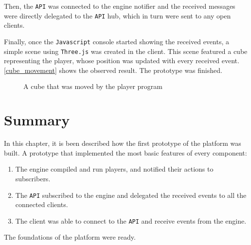 \documentclass[a4paper,11pt,titlepage,abstract,numbers=noenddot,automark,mnsy,intlimits,rgb,dvipsnames]{report}
\begin{document}
Then, the \texttt{API} was connected to the engine notifier and the received messages were directly delegated to the \texttt{API} hub,
which in turn were sent to any open clients.

Finally, once the \texttt{Javascript} console started showing the received events, a simple scene using \texttt{Three.js} was created in the
client. This scene featured a cube representing the player, whose position was updated with every received event.
\autoref{cube_movement} shows the observed result. The prototype was finished.
\begin{figure}[H]
\begin{center}
\noindent{}
\end{center}
\caption{A cube that was moved by the player program}
\label{cube_movement}
\end{figure}
\section{Summary}
In this chapter, it is been described how the first prototype of the platform was built. A prototype that implemented the
most basic features of every component:
\begin{enumerate}
\item
The engine compiled and run players, and notified their actions to subscribers.
\item
The \texttt{API} subscribed to the engine and delegated the received events to all the connected clients.
\item
The client was able to connect to the \texttt{API} and receive events from the engine.
\end{enumerate}
The foundations of the platform were ready.
\end{document}
